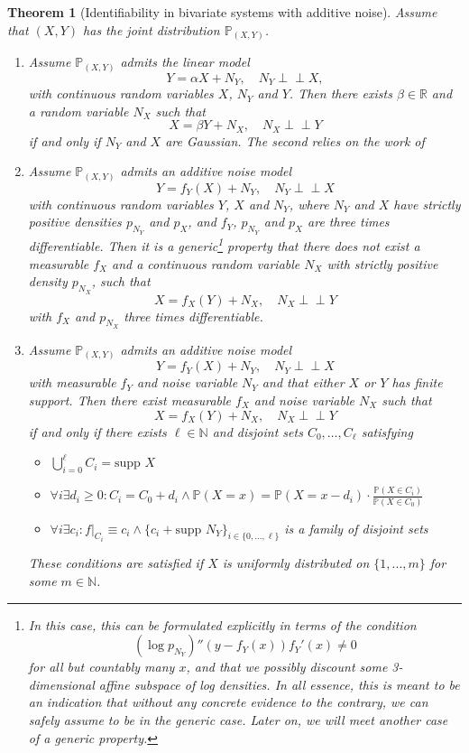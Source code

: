 \documentclass[11pt, a4paper]{memoir}
\theoremstyle{break}
\newtheorem{thm}{Theorem}
\theoremstyle{break}
\theoremstyle{nonumberplain}
\newcommand{\mN}{\mathbb{N}}
\newcommand{\mR}{\mathbb{R}}
\newcommand{\mP}{\mathbb{P}}
\newcommand{\indep}{\perp \!\!\! \perp}
\begin{document}
\begin{thm}[Identifiability in bivariate systems with additive noise]
Assume that $(X,Y)$ has the joint distribution $\mP_{(X,Y)}$.
\begin{enumerate}[label=(\roman*)]
	\item Assume $\mP_{(X,Y)}$ admits the linear model
	$$Y=\alpha X+N_Y,\quad N_Y\indep X,$$
	with continuous random variables $X$, $N_Y$ and $Y$. Then there exists $\beta\in \mR$ and a random variable $N_X$ such that $$X=\beta Y+N_X,\quad N_X\indep Y$$
	if and only if $N_Y$ and $X$ are Gaussian. The second relies on the work of 
	\item Assume $\mP_{(X,Y)}$ admits an additive noise model
	$$Y=f_Y(X)+N_Y,\quad N_Y\indep X$$
	with continuous random variables $Y$, $X$ and $N_Y$, where $N_Y$ and $X$ have strictly positive densities $p_{N_Y}$ and $p_X$, and $f_Y$, $p_{N_Y}$ and $p_X$ are three times differentiable. Then it is a generic\footnote{In this case, this can be formulated explicitly in terms of the condition
	$$(\log p_{N_Y})''(y-f_Y(x))f_Y'(x)\neq 0$$
	for all but countably many $x$, and that we possibly discount some 3-dimensional affine subspace of log densities. In all essence, this is meant to be an indication that without any concrete evidence to the contrary, we can safely assume to be in the generic case. Later on, we will meet another case of a generic property.} property that there does not exist a measurable $f_X$ and a continuous random variable $N_X$ with strictly positive density $p_{N_X}$, such that
	$$X=f_X(Y)+N_X,\quad N_X\indep Y$$
	with $f_X$ and $p_{N_X}$ three times differentiable.
	\item Assume $\mP_{(X,Y)}$ admits an additive noise model
	$$Y=f_Y(X)+N_Y,\quad N_Y\indep X$$
	with measurable $f_Y$ and noise variable $N_Y$ and that either $X$ or $Y$ has finite support. Then there exist measurable $f_X$ and noise variable $N_X$ such that
	$$X=f_X(Y)+N_X,\quad N_X\indep Y$$
	if and only if there exists $\ell\in \mN$ and disjoint sets $C_0,\ldots, C_\ell$ satisfying
	\begin{itemize}
		\item $\bigcup_{i=0}^{\ell}C_i=\text{supp } X$
		\item $\forall i\exists d_i\geqslant 0: C_i=C_0+d_i\wedge \mP(X=x)=\mP(X=x-d_i)\cdot \frac{\mP(X\in C_i)}{\mP(X\in C_0)}$
		\item $\forall i\exists c_i: f|_{C_i}\equiv c_i\wedge \{c_i+\text{supp } N_Y\}_{i\in \{0,\ldots,\ell\}}$ is a family of disjoint sets
	\end{itemize}
	These conditions are satisfied if $X$ is uniformly distributed on $\{1,...,m\}$ for some $m\in \mN$.
\end{enumerate}
\end{thm}
\end{document}
